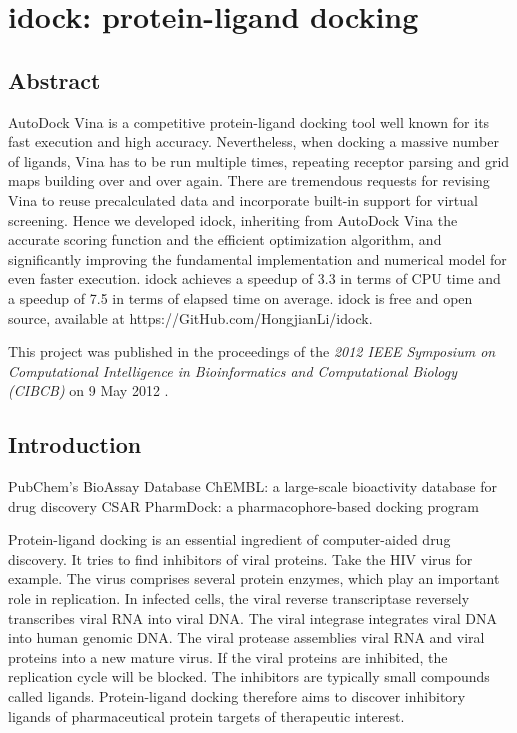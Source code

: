 \chapter{idock: protein-ligand docking}

\section{Abstract}

AutoDock Vina is a competitive protein-ligand docking tool well known for its fast execution and high accuracy. Nevertheless, when docking a massive number of ligands, Vina has to be run multiple times, repeating receptor parsing and grid maps building over and over again. There are tremendous requests for revising Vina to reuse precalculated data and incorporate built-in support for virtual screening. Hence we developed idock, inheriting from AutoDock Vina the accurate scoring function and the efficient optimization algorithm, and significantly improving the fundamental implementation and numerical model for even faster execution. idock achieves a speedup of 3.3 in terms of CPU time and a speedup of 7.5 in terms of elapsed time on average. idock is free and open source, available at https://GitHub.com/HongjianLi/idock.

This project was published in the proceedings of the \textit{2012 IEEE Symposium on Computational Intelligence in Bioinformatics and Computational Biology (CIBCB)} on 9 May 2012 \citep{1153}.

\section{Introduction}

\citep{1422} PubChem's BioAssay Database
\citep{1424} ChEMBL: a large-scale bioactivity database for drug discovery
\citep{1341} CSAR
\citep{1376} PharmDock: a pharmacophore-based docking program

Protein-ligand docking is an essential ingredient of computer-aided drug discovery. It tries to find inhibitors of viral proteins. Take the HIV virus for example. The virus comprises several protein enzymes, which play an important role in replication. In infected cells, the viral reverse transcriptase reversely transcribes viral RNA into viral DNA. The viral integrase integrates viral DNA into human genomic DNA. The viral protease assemblies viral RNA and viral proteins into a new mature virus. If the viral proteins are inhibited, the replication cycle will be blocked. The inhibitors are typically small compounds called ligands. Protein-ligand docking therefore aims to discover inhibitory ligands of pharmaceutical protein targets of therapeutic interest. %

